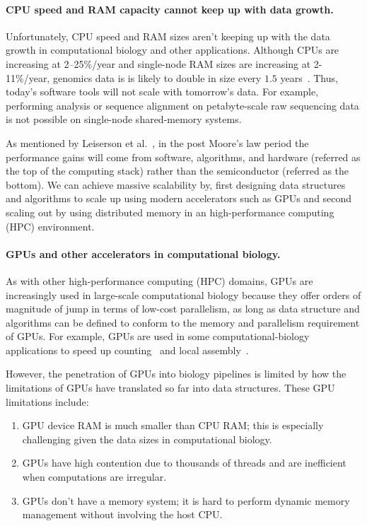 \label{sec:we-need-performance-and-scalability}
\paragraph{CPU speed and RAM capacity cannot keep up with data growth.}
Unfortunately, CPU speed and RAM sizes aren't keeping up with the data growth in computational biology and other applications.
Although CPUs are increasing at 2--25\%/year and single-node RAM sizes are increasing at 2-11\%/year, genomics data is is likely to double in size every $1.5$ years~\cite{kodama2012sequence}.
Thus, today's software tools will not scale with tomorrow's data. For example, performing \kmer analysis or sequence alignment on petabyte-scale raw sequencing data is not possible on single-node shared-memory systems.

As mentioned by Leiserson et al.~\cite{leiserson2020there}, in the post Moore’s law period the performance gains will come from software, algorithms, and hardware (referred as the top of the computing stack) rather than the semiconductor (referred as the bottom). We can achieve massive scalability by, first designing data structures and algorithms to scale up using modern accelerators such as GPUs and second scaling out by using distributed memory in an high-performance computing (HPC) environment.


\paragraph{GPUs and other accelerators in computational biology.}
As with other high-performance computing (HPC) domains,
GPUs are increasingly used in large-scale computational biology because they offer orders of magnitude of jump in terms of low-cost parallelism, as long as data structure and algorithms can be defined to conform to the memory and parallelism requirement of GPUs.
%
For example, GPUs are used in some computational-biology applications to speed up \kmer counting~\cite{nisa2021distributed} and local assembly~\cite{awan2021accelerating}.

However, the penetration of GPUs into biology pipelines is limited by how the limitations of GPUs have translated so far into data structures.  These GPU limitations include:
\begin{enumerate}
  \item GPU device RAM is much smaller than CPU RAM; this is especially
    challenging given the data sizes in computational biology.
  \item GPUs have high contention due to thousands of threads and are
    inefficient when computations are irregular.
  \item GPUs don't have a memory system; it is hard to perform dynamic memory management without involving the host CPU.
\end{enumerate}

